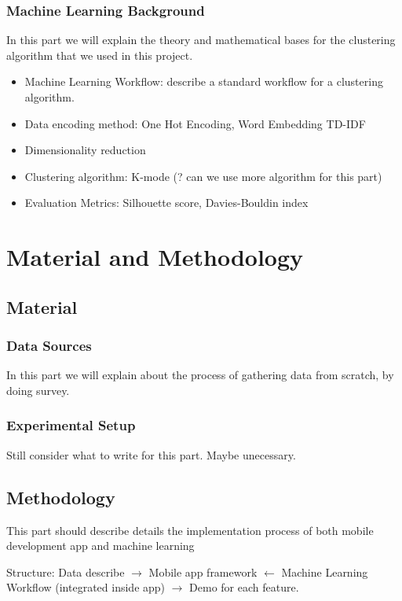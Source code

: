 \documentclass{article}
\begin{document}
\subsubsection{Machine Learning Background}
In this part we will explain the theory and mathematical bases for
the clustering algorithm that we used in this project.
\begin{itemize} 
    \item Machine Learning Workflow: describe a standard workflow for a clustering
    algorithm.
    \item Data encoding method: One Hot Encoding, Word Embedding TD-IDF
    \item Dimensionality reduction
    \item Clustering algorithm: K-mode (? can we use more algorithm for this part)
    \item Evaluation Metrics: Silhouette score, Davies-Bouldin index

\end{itemize}

\section{Material and Methodology}
\subsection{Material}
\subsubsection{Data Sources}
In this part we will explain about the process of gathering data
from scratch, by doing survey.

\subsubsection{Experimental Setup}
Still consider what to write for this part. Maybe unecessary.

\subsection{Methodology}

This part should describe details the implementation process
of both mobile development app and machine learning

Structure: Data describe $\rightarrow$ Mobile app framework $\leftarrow$ Machine Learning Workflow (integrated inside app) $\rightarrow$ Demo for each feature.
\end{document}
